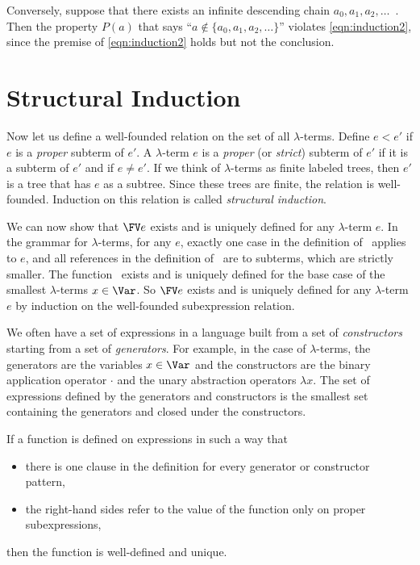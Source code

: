 Conversely, suppose that there exists an infinite descending chain $a_0,a_1,a_2,\ldots$~. Then the property $P(a)$ that says ``$a\notin\{a_0,a_1,a_2,\ldots\}$'' violates \eqref{eqn:induction2}, since the premise of \eqref{eqn:induction2} holds but not the conclusion.

\section{Structural Induction}

Now let us define a well-founded relation on the set of all $\lambda$-terms. Define $e \lt e'$ if $e$ is a \emph{proper} subterm of $e'$. A $\lambda$-term $e$ is a \emph{proper} (or \emph{strict}) subterm of $e'$ if it is a subterm of $e'$ and if $e\neq e'$. If we think of $\lambda$-terms as finite labeled trees, then $e'$ is a tree that has $e$ as a subtree. Since these trees are finite, the relation is well-founded. Induction on this relation is called \emph{structural induction}.

We can now show that $\FV e$ exists and is uniquely defined for any $\lambda$-term $e$. In the grammar for $\lambda$-terms, for any $e$, exactly one case in the definition of \FVname\ applies to $e$, and all references in the definition of \FVname\ are to subterms, which are strictly smaller. The function \FVname\ exists and is uniquely defined for the base case of the smallest $\lambda$-terms $x\in\Var$. So $\FV e$ exists and is uniquely defined for any $\lambda$-term $e$ by induction on the well-founded subexpression relation.

We often have a set of expressions in a language built from a set of \emph{constructors} starting from a set of \emph{generators}. For example, in the case of $\lambda$-terms, the generators are the variables $x\in\Var$ and the constructors are the binary application operator $\cdot$ and the unary abstraction operators $\lambda x$. The set of expressions defined by the generators and constructors is the smallest set containing the generators and closed under the constructors.

If a function is defined on expressions in such a way that
\begin{itemize}
\item there is one clause in the definition for every generator or constructor pattern,
\item the right-hand sides refer to the value of the function only on proper subexpressions,
\end{itemize}
then the function is well-defined and unique.

